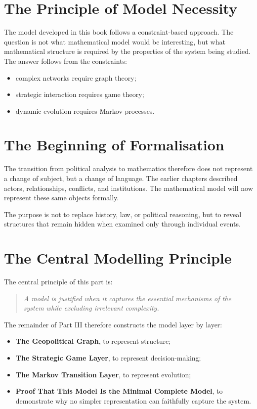 \documentclass[11pt,openany]{book}
\theoremstyle{plain}
\theoremstyle{definition}
\begin{document}
\section*{The Principle of Model Necessity}

The model developed in this book follows a constraint-based approach. The question is not what mathematical model would be interesting, but what mathematical structure is required by the properties of the system being studied. The answer follows from the constraints:

\begin{itemize}
    \item complex networks require graph theory;

    \item strategic interaction requires game theory;

    \item dynamic evolution requires Markov processes.
\end{itemize}

\section*{The Beginning of Formalisation}

The transition from political analysis to mathematics therefore does not represent a change of subject, but a change of language. The earlier chapters described actors, relationships, conflicts, and institutions. The mathematical model will now represent these same objects formally.

The purpose is not to replace history, law, or political reasoning, but to reveal structures that remain hidden when examined only through individual events.

\section*{The Central Modelling Principle}

The central principle of this part is:
\begin{quote}
\textit{A model is justified when it captures the essential mechanisms of the system while excluding irrelevant complexity.}
\end{quote}

The remainder of Part III therefore constructs the model layer by layer:
\begin{itemize}
\item \textbf{The Geopolitical Graph}, to represent structure;
\item \textbf{The Strategic Game Layer}, to represent decision-making;
\item \textbf{The Markov Transition Layer}, to represent evolution;
\item \textbf{Proof That This Model Is the Minimal Complete Model}, to demonstrate why no simpler representation can faithfully capture the system.
\end{itemize}
\end{document}
